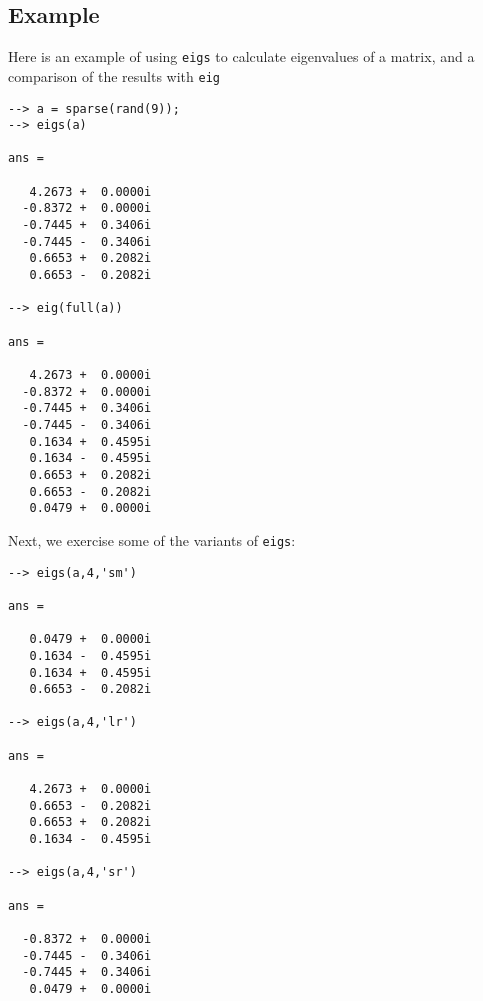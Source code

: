 \subsection{Example}

Here is an example of using \verb|eigs| to calculate eigenvalues
of a matrix, and a comparison of the results with \verb|eig|
\begin{verbatim}
--> a = sparse(rand(9));
--> eigs(a)

ans = 

   4.2673 +  0.0000i 
  -0.8372 +  0.0000i 
  -0.7445 +  0.3406i 
  -0.7445 -  0.3406i 
   0.6653 +  0.2082i 
   0.6653 -  0.2082i 

--> eig(full(a))

ans = 

   4.2673 +  0.0000i 
  -0.8372 +  0.0000i 
  -0.7445 +  0.3406i 
  -0.7445 -  0.3406i 
   0.1634 +  0.4595i 
   0.1634 -  0.4595i 
   0.6653 +  0.2082i 
   0.6653 -  0.2082i 
   0.0479 +  0.0000i 
\end{verbatim}
Next, we exercise some of the variants of \verb|eigs|:
\begin{verbatim}
--> eigs(a,4,'sm')

ans = 

   0.0479 +  0.0000i 
   0.1634 -  0.4595i 
   0.1634 +  0.4595i 
   0.6653 -  0.2082i 

--> eigs(a,4,'lr')

ans = 

   4.2673 +  0.0000i 
   0.6653 -  0.2082i 
   0.6653 +  0.2082i 
   0.1634 -  0.4595i 

--> eigs(a,4,'sr')

ans = 

  -0.8372 +  0.0000i 
  -0.7445 -  0.3406i 
  -0.7445 +  0.3406i 
   0.0479 +  0.0000i 
\end{verbatim}
